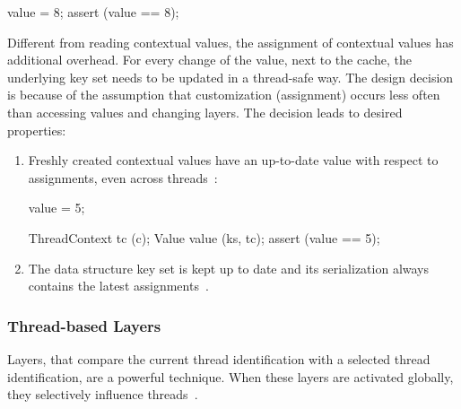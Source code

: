 \begin{code}[language=Cpp]
value = 8;
assert (value == 8);
\end{code}

Different from reading contextual values, the assignment of contextual values has additional overhead.
For every change of the value, next to the cache, the underlying key set needs to be updated in a thread-safe way.
The design decision is because of the assumption that customization (assignment) occurs less often than accessing values and changing layers.
The decision leads to desired properties:
\begin{enumerate}
\item 
Freshly created contextual values have an up-to-date value with respect to assignments, even across threads~\cite{raab2015global}:
\begin{multicols}{2}
\begin{code}[language=Cpp,xleftmargin=0ex,xrightmargin=0ex]
value = 5;



\end{code}

\columnbreak

\begin{code}[language=Cpp,xleftmargin=0ex,xrightmargin=0ex,numbers=right]

ThreadContext tc (c);
Value value (ks, tc);
assert (value == 5);
\end{code}
\end{multicols}

\item
The data structure key set is kept up to date and its serialization always contains the latest assignments~\cite{raab2015global}.
\end{enumerate}





\subsubsection{Thread-based Layers}
\label{sec:thread-layer}


Layers, that compare the current thread identification with a selected thread identification, are a powerful technique.
When these layers are activated globally, they selectively influence threads~\cite{raab2015global}.

